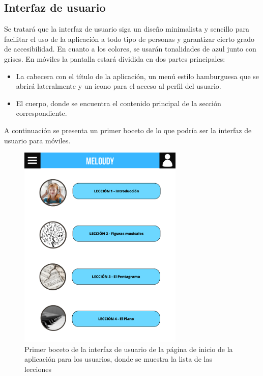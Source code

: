\subsection{Interfaz de usuario}
Se tratará que la interfaz de usuario siga un diseño minimalista y sencillo para facilitar el uso de la aplicación a todo tipo de personas y 
garantizar cierto grado de accesibilidad. En cuanto a los colores, se usarán tonalidades de azul junto con grises.
En móviles la pantalla estará dividida en dos partes principales: 
\begin{itemize}
    \item La cabecera con el título de la aplicación, un menú estilo hamburguesa que se abrirá lateralmente y un icono para el acceso al perfil del usuario.
    \item El cuerpo, donde se encuentra el contenido principal de la sección correspondiente.
\end{itemize}

    A continuación se presenta un primer boceto de lo que podría ser la interfaz de usuario para móviles.

\begin{figure}[H]

    \centering
    \includegraphics[width=0.7\textwidth]{imagenes/c3/boceto.png}
    \caption{Primer boceto de la interfaz de usuario de la página de inicio de la aplicación para los usuarios, donde se muestra la lista de las lecciones}
    \label{fig:artly}

\end{figure}

